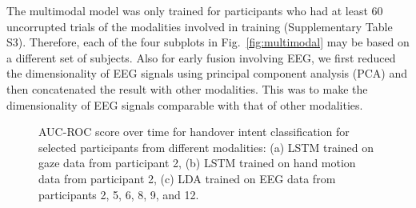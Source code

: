 The multimodal model was only trained for participants who had at least 60 uncorrupted trials of the modalities involved in training (Supplementary Table S3). Therefore, each of the four subplots in Fig.~\ref{fig:multimodal} may be based on a different set of subjects. Also for early fusion involving EEG, we first reduced the dimensionality of EEG signals using principal component analysis (PCA) and then concatenated the result with other modalities. This was to make the dimensionality of EEG signals comparable with that of other modalities.

\begin{figure}[b!]
    \centering
    \caption{AUC-ROC score over time for handover intent classification for selected participants from different modalities: (a) LSTM trained on gaze data from participant 2, (b) LSTM trained on hand motion data from participant 2, (c) LDA trained on EEG data from participants 2, 5, 6, 8, 9, and 12.}
    \label{fig:selected}
\end{figure}




